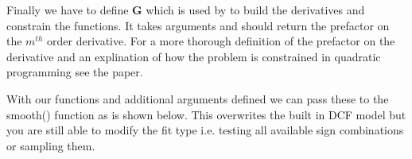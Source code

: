 \documentclass[letterpaper,10pt,english]{sphinxmanual}
\begin{document}
Finally we have to define \({\mathbf{G}}\) which is used by  to
build the derivatives and constrain the functions. It takes arguments
 and should return the prefactor on the
\({m^{th}}\) order derivative. For a more thorough definition of the
prefactor on the derivative and an explination of how the problem is
constrained in quadratic programming see the  paper.

\begin{sphinxVerbatim}[commandchars=\\\{\}]
     

      \PYG{p}{[}\PYG{p}{]}
       
             
            \PYG{p}{[}\PYG{p}{]}
         
              \PYG{p}{[}\PYG{p}{]}  \PYGZbs{}
                  \PYGZbs{}
                  \PYGZbs{}
                \PYG{p}{[}\PYG{p}{]}  

     
\end{sphinxVerbatim}

With our functions and additional arguments defined we can pass these
to the  smooth() function as is shown below. This overwrites the
built in DCF model but you are still able to modify the fit type i.e. testing all
available sign combinations or sampling them.
\end{document}
